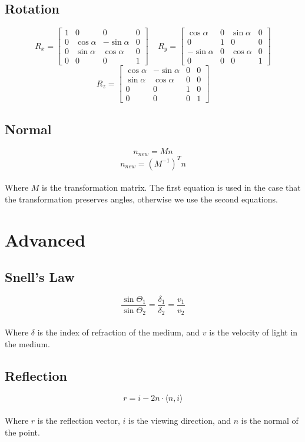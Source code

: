 \documentclass{article}
\begin{document}
\subsection{Rotation}
\vspace{.3cm}
\[ R_x = \begin{bmatrix} 1 & 0 & 0 & 0 \\ 0 & \cos \alpha & -\sin \alpha & 0 \\ 0 & \sin \alpha & \cos \alpha & 0 \\ 0 & 0 & 0 & 1 \end{bmatrix} ~~~~~ R_y = \begin{bmatrix} \cos \alpha & 0 & \sin \alpha & 0 \\ 0 & 1 & 0 & 0 \\ -\sin \alpha & 0 & \cos \alpha & 0 \\ 0 & 0 & 0 & 1 \end{bmatrix} \]
\[ R_z = \begin{bmatrix} \cos \alpha & -\sin \alpha & 0 & 0 \\ \sin \alpha & \cos \alpha & 0 & 0 \\ 0 & 0 & 1 & 0 \\ 0 & 0 & 0 & 1 \end{bmatrix} \]

\subsection{Normal}
\vspace{.3cm}
\[ n_{new} = Mn \]
\[ n_{new} = (M^{-1})^Tn \] \\
Where $M$ is the transformation matrix. The first equation is used in the case that the transformation preserves angles, otherwise we use the second equations.

\section{Advanced}
\subsection{Snell's Law}
\vspace{.3cm}
\[ \frac{\sin \Theta_1}{\sin \Theta_2} = \frac{\delta_1}{\delta_2} = \frac{v_1}{v_2} \] \\
Where $\delta$ is the index of refraction of the medium, and $v$ is the velocity of light in the medium.

\subsection{Reflection}
\vspace{.3cm}
\[ r = i - 2n \cdot \langle n, i \rangle \] \\
Where $r$ is the reflection vector, $i$ is the viewing direction, and $n$ is the normal of the point.
\end{document}

